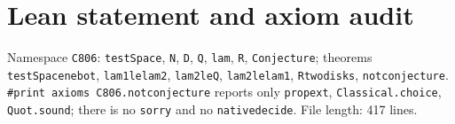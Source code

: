 \documentclass[11pt]{article}
\renewcommand{\_}{\oldus\allowbreak}
\theoremstyle{definition}
\theoremstyle{remark}
\begin{document}
\section{Lean statement and axiom audit}

Namespace \texttt{C806}: \texttt{testSpace}, \texttt{N}, \texttt{D}, \texttt{Q}, \texttt{lam}, \texttt{R},
\texttt{Conjecture}; theorems \texttt{testSpace\_ne\_bot}, \texttt{lam1\_le\_lam2}, \texttt{lam2\_le\_Q},
\texttt{lam2\_le\_lam1}, \texttt{R\_two\_disks}, \texttt{not\_conjecture}.
\texttt{\#print axioms C806.not\_conjecture} reports only \texttt{propext}, \texttt{Classical.choice},
\texttt{Quot.sound}; there is no \texttt{sorry} and no \texttt{native\_decide}. File length: 417 lines.
\end{document}
